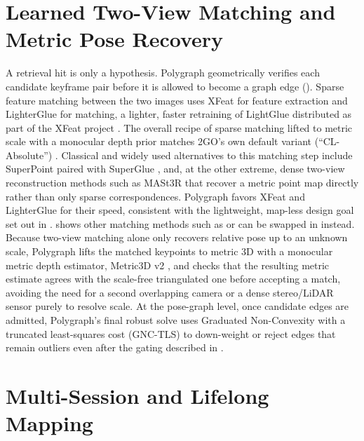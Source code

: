 \section{Learned Two-View Matching and Metric Pose Recovery}

A retrieval hit is only a hypothesis. Polygraph geometrically verifies each candidate keyframe pair before it is allowed to become a graph edge (). Sparse feature matching between the two images uses XFeat \cite{potje2024xfeat} for feature extraction and LighterGlue for matching, a lighter, faster retraining of LightGlue \cite{lindenberger2023lightglue} distributed as part of the XFeat project \cite{potje2024xfeat}. The overall recipe of sparse matching lifted to metric scale with a monocular depth prior matches 2GO's own default variant (``CL-Absolute'') \cite{lim2025twogo}. Classical and widely used alternatives to this matching step include SuperPoint \cite{detone2018superpoint} paired with SuperGlue \cite{sarlin2020superglue}, and, at the other extreme, dense two-view reconstruction methods such as MASt3R \cite{leroy2024mast3r} that recover a metric point map directly rather than only sparse
correspondences. Polygraph favors XFeat \cite{potje2024xfeat} and LighterGlue \cite{lindenberger2023lightglue} for their speed, consistent with the lightweight, map-less design goal set out in .  shows other matching methods such as \cite{loftr} or \cite{leroy2024mast3r} can be swapped in instead. Because two-view matching alone only recovers relative pose up to an unknown scale, Polygraph lifts the matched keypoints to metric 3D with a monocular metric depth estimator, Metric3D v2 \cite{hu2024metric3dv2}, and checks that the resulting metric estimate agrees with the scale-free triangulated one before accepting a match, avoiding the need for a second overlapping camera or a dense stereo/LiDAR sensor purely to resolve scale. At the pose-graph level, once candidate edges are admitted, Polygraph's final robust solve uses Graduated Non-Convexity with a truncated least-squares cost (GNC-TLS) \cite{yang2020gnc} to down-weight or reject edges that remain outliers even after the gating described in .

\section{Multi-Session and Lifelong Mapping}

